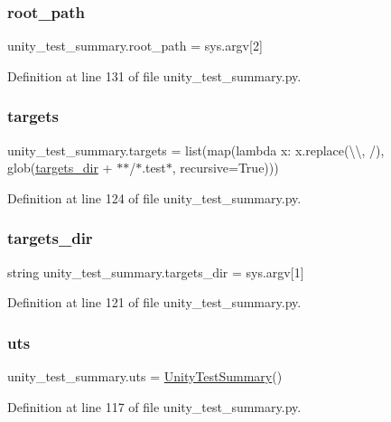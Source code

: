 \subsubsection{\texorpdfstring{root\+\_\+path}{root\_path}}
{\footnotesize\ttfamily unity\+\_\+test\+\_\+summary.\+root\+\_\+path = sys.\+argv\mbox{[}2\mbox{]}}



Definition at line 131 of file unity\+\_\+test\+\_\+summary.\+py.

\mbox{\label{namespaceunity__test__summary_afdc9304023381cdb89317b5dd703f2ff}} 
\subsubsection{\texorpdfstring{targets}{targets}}
{\footnotesize\ttfamily unity\+\_\+test\+\_\+summary.\+targets = list(map(lambda x\+: x.\+replace(\textquotesingle{}\textbackslash{}\textbackslash{}\textquotesingle{}, \textquotesingle{}/\textquotesingle{}), glob(\hyperlink{namespaceunity__test__summary_a45730122ae42bdf203b5ae5525b77736}{targets\+\_\+dir} + \textquotesingle{}$\ast$$\ast$/$\ast$.test$\ast$\textquotesingle{}, recursive=True)))}



Definition at line 124 of file unity\+\_\+test\+\_\+summary.\+py.

\mbox{\label{namespaceunity__test__summary_a45730122ae42bdf203b5ae5525b77736}} 
\subsubsection{\texorpdfstring{targets\+\_\+dir}{targets\_dir}}
{\footnotesize\ttfamily string unity\+\_\+test\+\_\+summary.\+targets\+\_\+dir = sys.\+argv\mbox{[}1\mbox{]}}



Definition at line 121 of file unity\+\_\+test\+\_\+summary.\+py.

\mbox{\label{namespaceunity__test__summary_ac32d80a4d2e00ce829ad0c119fe19bc3}} 
\subsubsection{\texorpdfstring{uts}{uts}}
{\footnotesize\ttfamily unity\+\_\+test\+\_\+summary.\+uts = \hyperlink{classunity__test__summary_1_1_unity_test_summary}{Unity\+Test\+Summary}()}



Definition at line 117 of file unity\+\_\+test\+\_\+summary.\+py.


